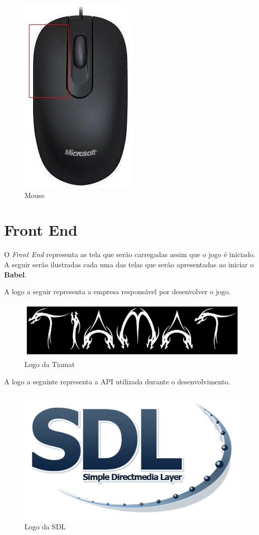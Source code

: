 \documentclass[11pt]{article} %
\begin{document}
\begin{figure}[!htp]
\centering
\includegraphics[scale=0.4]{res/mouse.jpg}
\caption{Mouse}
\label{Mouse}
\end{figure}

\section{Front End}

O \textit{Front End} representa as tela que serão carregadas assim que o jogo é iniciado. A seguir serão ilustradas cada uma das telas que serão apresentadas ao iniciar o \textbf{Babel}.

A logo a seguir representa a empresa responsável por desenvolver o jogo.

\begin{figure}[!htp]
\centering
\includegraphics[scale=0.6]{res/tiamat_logo.png}
\caption{Logo da Tiamat}
\label{Logo da Tiamat}
\end{figure}

A logo a seguinte representa a API utilizada durante o desenvolvimento.

\begin{figure}[!htp]
\centering
\includegraphics[scale=0.6]{res/Sdl-logo.png}
\caption{Logo da SDL}
\label{Logo da SDL}
\end{figure}
\end{document}
